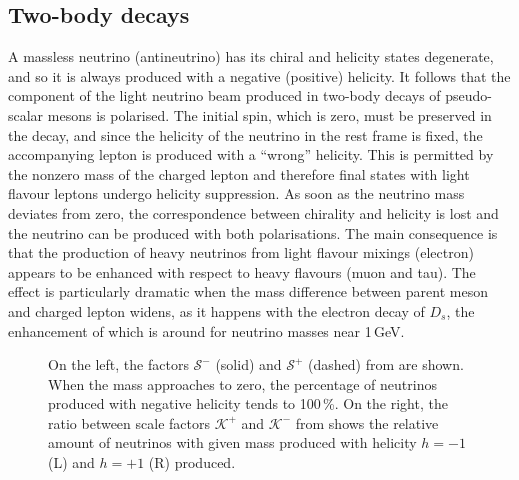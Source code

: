 \subsection{Two-body decays}
\label{sec:production_2body}

A massless neutrino (antineutrino) has its chiral and helicity states degenerate, and so %
it is always produced with a negative (positive) helicity.
It follows that the component of the light neutrino beam produced in two-body decays of pseudo-scalar mesons is polarised.
The initial spin, which is zero, must be preserved in the decay, and since the helicity of the neutrino in the rest frame %
is fixed, the accompanying lepton is produced with a ``wrong'' helicity.
This is permitted by the nonzero mass of the charged lepton and %
therefore final states with light flavour leptons undergo helicity suppression.
As soon as the neutrino mass deviates from zero, the correspondence between chirality and helicity is lost %
and the neutrino can be produced with both polarisations.
The main consequence is that the production of heavy neutrinos from light flavour mixings (electron) appears to be enhanced with %
respect to heavy flavours (muon and tau).
The effect is particularly dramatic when the mass difference between parent meson and charged lepton widens, %
as it happens with the electron decay of $D_s$, the enhancement of which is around  for neutrino masses near 1\,GeV.

\begin{figure}
	\centering
	{\resizebox{0.5\linewidth}{!}{}}
	\hspace{-1em}
	{\resizebox{0.5\linewidth}{!}{}}
	\caption[Helicity factors for production of HNL]%
		{On the left, the factors $\mathcal{S}^-$ (solid) and $\mathcal{S}^+$ (dashed) %
		from  are shown.
		When the mass approaches to zero, the percentage of neutrinos produced %
		with negative helicity tends to 100\,\%.
		On the right, the ratio between scale factors $\mathcal{K}^+$ and $\mathcal{K}^-$ %
		from  shows the relative amount of neutrinos %
		with given mass produced with helicity $h=-1$ (L) and $h=+1$ (R) produced.}
	\label{fig:helix}
\end{figure}

